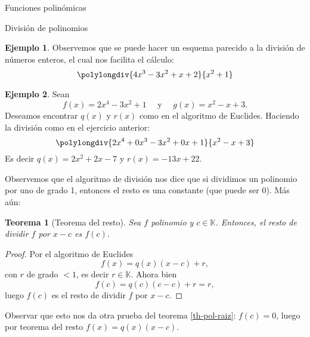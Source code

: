 \documentclass[a4paper,12pt,twoside,spanish,reqno]{amsbook}
\newtheorem{teorema}{Teorema}[section]
\theoremstyle{definition}
\newtheorem{ejemplo}{Ejemplo}[section]
\theoremstyle{remark}
\newcommand{\K}{\mathbb K}
\begin{document}
\begin{chapter}{Funciones polinómicas}
\begin{section}{División de polinomios}
\begin{ejemplo}
    Observemos que se puede hacer un esquema parecido a  la división de números enteros, el cual nos facilita el cálculo:
    \begin{equation*}
        \polylongdiv{4x^3 - 3x^2 + x + 2}{ x^2 + 1}
    \end{equation*}
\end{ejemplo}

\begin{ejemplo}
    Sean
    \begin{equation*}
        f (x) = 2x^4 - 3x^2 + 1 \quad \text{ y } \quad g (x) = x^2 - x + 3.
    \end{equation*}
    Deseamos encontrar $q (x)$ y $r (x)$ como en el algoritmo de Euclides. Haciendo la división como en el ejercicio anterior:
    \begin{equation*}
    \polylongdiv{2x^4 +0x^3- 3x^2 +0x+ 1}{x^2 - x + 3}
    \end{equation*}
    Es decir $q(x) = 2x^2+2x-7$ y $r(x)= -13x+22$.
\end{ejemplo}

Observemos que el algoritmo de división nos dice que si dividimos un polinomio por uno de grado 1,  entonces el resto es una constante (que puede ser 0). Más aún:

\begin{teorema}[Teorema del  resto] Sea $f$ polinomio y $c \in \K$. Entonces,  el resto de dividir $f$ por $x-c$ es $f(c)$. 
\end{teorema}
\begin{proof} Por  el algoritmo de Euclides
    \begin{equation*}
        f(x) = q(x)(x-c) + r,
    \end{equation*}
    con $r$ de grado $<1$,  es decir $r \in \K$.  Ahora bien
    \begin{equation*}
    f(c) = q(c)(c-c) + r = r,
    \end{equation*}
    luego $f(c)$  es el resto de dividir $f$ por $x-c$. 
\end{proof}

Observar que esto  nos da otra prueba del teorema \ref{th-pol-raiz}: $f(c)=0$, luego por teorema del resto $ f(x)=q(x)(x-c)$. 
        
    \end{section}	
    \end{chapter}	
\end{document}
